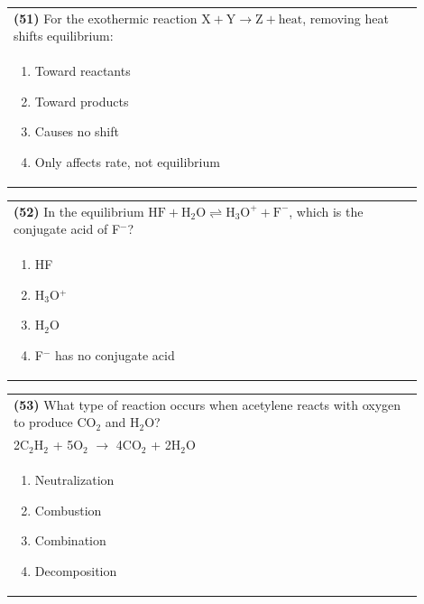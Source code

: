 \documentclass{article}
\begin{document}
\noindent\begin{tabular}{|p{0.9\linewidth}|}
\hline
\textbf{(51)} For the exothermic reaction $\text{X} + \text{Y} \rightarrow \text{Z} + \text{heat}$, removing heat shifts equilibrium: \\[0.2cm]
\begin{minipage}[t]{0.85\linewidth}
\begin{enumerate}[label=\alph*.]
\item Toward reactants
\item Toward products
\item Causes no shift
\item Only affects rate, not equilibrium
\end{enumerate}
\end{minipage}\\[0.2cm]
\hline
\end{tabular}

\noindent\begin{tabular}{|p{0.9\linewidth}|}
\hline
\textbf{(52)} In the equilibrium $\text{HF} + \text{H}_2\text{O} \rightleftharpoons \text{H}_3\text{O}^+ + \text{F}^-$, which is the conjugate acid of F$^-$? \\[0.2cm]
\begin{minipage}[t]{0.85\linewidth}
\begin{enumerate}[label=\alph*.]
\item HF
\item H$_3$O$^+$
\item H$_2$O
\item F$^-$ has no conjugate acid
\end{enumerate}
\end{minipage}\\[0.2cm]
\hline
\end{tabular}
\newpage

\noindent\begin{tabular}{|p{0.9\linewidth}|}
\hline
\textbf{(53)} What type of reaction occurs when acetylene reacts with oxygen to produce CO$_2$ and H$_2$O?\\[0.2cm]
2C$_2$H$_2$ + 5O$_2$ $\rightarrow$ 4CO$_2$ + 2H$_2$O\\[0.2cm]
\begin{minipage}[t]{0.85\linewidth}
\begin{enumerate}[label=\alph*.]
\item Neutralization
\item Combustion
\item Combination
\item Decomposition
\end{enumerate}
\end{minipage}\\[0.2cm]
\hline
\end{tabular}
\end{document}
